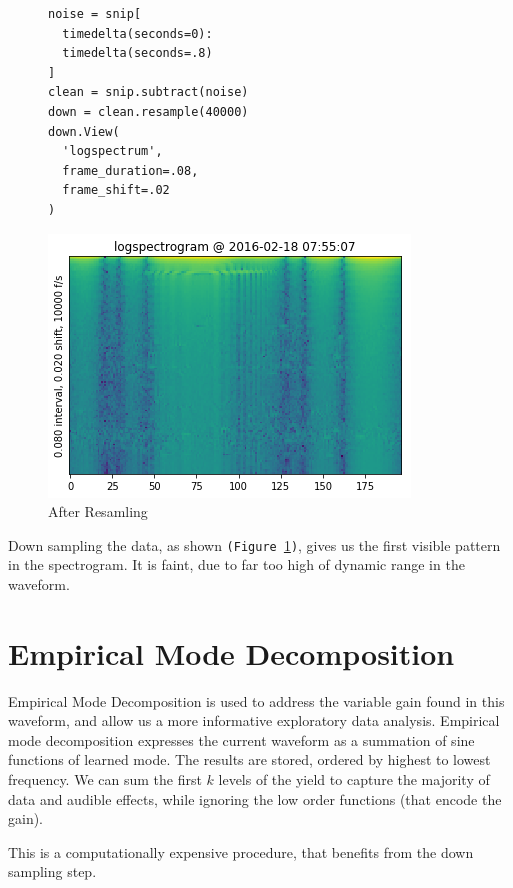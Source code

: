 \documentclass{article}
\begin{document}
\begin{multicols}{2}
\begin{figure}[H]
  \centering
  \begin{lstlisting}
noise = snip[
  timedelta(seconds=0):
  timedelta(seconds=.8)
]
clean = snip.subtract(noise)
down = clean.resample(40000)
down.View(
  'logspectrum',
  frame_duration=.08,
  frame_shift=.02
)
\end{lstlisting}
\includegraphics[width=\columnwidth]{./downspec.png}
  \caption{After Resamling}
  \label{fig:resample}

\end{figure}

Down sampling the data, as shown \texttt{(Figure~\ref{fig:resample})}, gives us the first visible pattern in the spectrogram. It is faint, due to far too high of dynamic range in the waveform.


\section{Empirical Mode Decomposition}

Empirical Mode Decomposition is used to address the variable gain found in this waveform, and allow us a more informative exploratory data analysis. Empirical mode decomposition expresses the current waveform as a summation of sine functions of learned mode. The results are stored, ordered by highest to lowest frequency. We can sum the first $k$ levels of the yield to capture the majority of data and audible effects, while ignoring the low order functions (that encode the gain).

This is a computationally expensive procedure, that benefits from the down sampling step.


\end{multicols}
\end{document}
